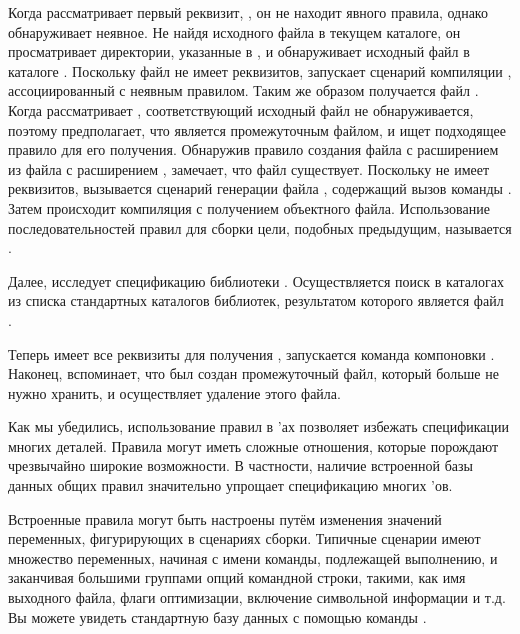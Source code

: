 Когда \GNUmake{} рассматривает первый реквизит,
, он не находит явного правила, однако
обнаруживает неявное. Не найдя исходного файла в текущем каталоге,
он просматривает директории, указанные в , и
обнаруживает исходный файл в каталоге . Поскольку файл
 не имеет реквизитов, \GNUmake{}
запускает сценарий компиляции ,
ассоциированный с неявным правилом.  Таким же образом получается файл
. Когда \GNUmake{} рассматривает
, соответствующий исходный файл не обнаруживается,
поэтому \GNUmake{} предполагает, что  является
промежуточным файлом, и ищет подходящее правило для его получения.
Обнаружив правило создания файла с расширением  из файла
с расширением , \GNUmake{} замечает, что файл
 существует. Поскольку  не имеет
реквизитов, вызывается сценарий генерации файла ,
содержащий вызов команды . Затем происходит компиляция с
получением объектного файла. Использование последовательностей правил
для сборки цели, подобных предыдущим, называется .

Далее, \GNUmake{} исследует спецификацию библиотеки .
Осуществляется поиск в каталогах из списка стандартных каталогов
библиотек, результатом которого является файл .

Теперь \GNUmake{} имеет все реквизиты для получения
, запускается команда компоновки .
Наконец, \GNUmake{} вспоминает, что был создан промежуточный файл,
который больше не нужно хранить, и осуществляет удаление этого файла.

Как мы убедились, использование правил в \Makefile{}'ах позволяет
избежать спецификации многих деталей. Правила могут иметь сложные
отношения, которые порождают чрезвычайно широкие возможности. В
частности, наличие встроенной базы данных общих правил значительно
упрощает спецификацию многих \Makefile{}'ов.

Встроенные правила могут быть настроены путём изменения значений
переменных, фигурирующих в сценариях сборки. Типичные сценарии имеют
множество переменных, начиная с имени команды, подлежащей выполнению,
и заканчивая большими группами опций командной строки, такими, как имя
выходного файла, флаги оптимизации, включение символьной информации и
т.д. Вы можете увидеть стандартную базу данных \GNUmake{} с помощью
команды .


